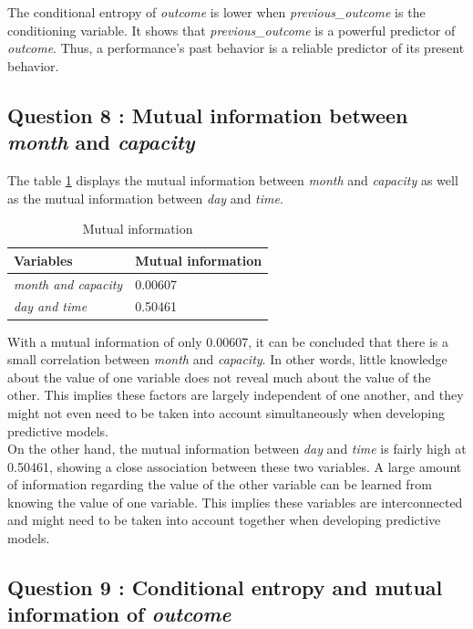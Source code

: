 \documentclass[titlepage]{article}
\begin{document}
The conditional entropy of \textit{outcome} is lower when \textit{previous\_outcome} is the conditioning variable. It shows that \textit{previous\_outcome} is a powerful predictor of \textit{outcome}. Thus, a performance's past behavior is a reliable predictor of its present behavior.

\newpage

\subsection*{Question 8 : Mutual information between \textit{month} and \textit{capacity}}

The table \ref{tab:q8} displays the mutual information between \textit{month} and \textit{capacity} as well as the mutual information between \textit{day} and \textit{time}. 

\begin{table}[h!]
    \centering
    \small
    \setlength{\tabcolsep}{4pt}
    \begin{tabular}{|p{4cm}|p{4cm}|}
        \hline 
        \textbf{Variables} & \textbf{Mutual information}\\
        \hline
        \textit{month and capacity} & 0.00607\\
        \hline
        \textit{day and time} & 0.50461\\
        \hline
    \end{tabular}
    \caption{Mutual information}
     \label{tab:q8}
\end{table}

With a mutual information of only 0.00607, it can be concluded that there is a small correlation between \textit{month} and \textit{capacity}. In other words, little knowledge about the value of one variable does not reveal much about the value of the other. This implies these factors are largely independent of one another, and they might not even need to be taken into account simultaneously when developing predictive models.\\

On the other hand, the mutual information between \textit{day} and \textit{time} is fairly high at 0.50461, showing a close association between these two variables. A large amount of information regarding the value of the other variable can be learned from knowing the value of one variable. This implies these variables are interconnected and might need to be taken into account together when developing predictive models.

\subsection*{Question 9 : Conditional entropy and mutual information of \textit{outcome}}
\end{document}
